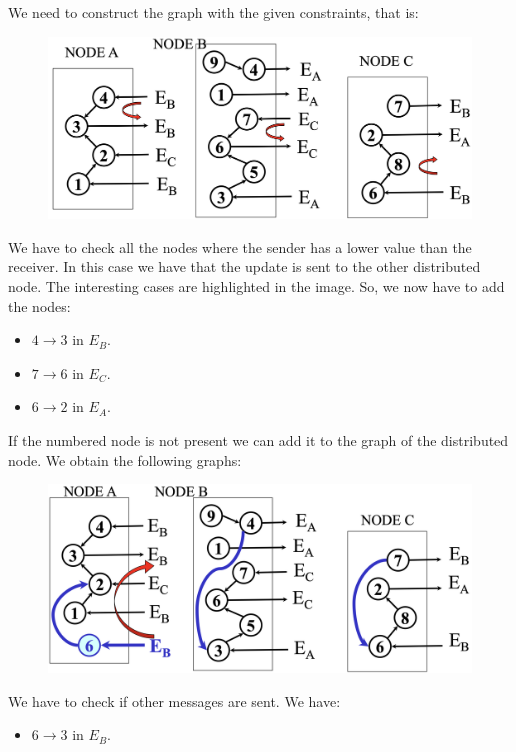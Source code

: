 \documentclass[12pt, a4paper]{report}
\newtheorem[style=M,bodystyle=\normalfont]{theorem}{Theorem}
\newtheorem[style=M,bodystyle=\normalfont]{corollary}{Corollary}
\newtheorem[style=M,bodystyle=\normalfont]{lemma}{Lemma}
\newtheorem[style=M,bodystyle=\normalfont]{definition}{Definition}
\begin{document}
\begin{Answer}[ref=13]
    We need to construct the graph with the given constraints, that is: 
    \begin{figure}[H]
        \centering
        \includegraphics[width=1\linewidth]{images/Ob1.png}
    \end{figure}
    We have to check all the nodes where the sender has a lower value than the receiver. In this case we have that the update is sent to the 
    other distributed node. The interesting cases are highlighted in the image. So, we now have to add the nodes: 
    \begin{itemize}
        \item $4 \rightarrow 3$ in $E_B$. 
        \item $7 \rightarrow 6$ in $E_C$. 
        \item $6 \rightarrow 2$ in $E_A$. 
    \end{itemize}
    If the numbered node is not present we can add it to the graph of the distributed node. We obtain the following graphs: 
    \begin{figure}[H]
        \centering
        \includegraphics[width=1\linewidth]{images/Ob2.png}
    \end{figure}
    We have to check if other messages are sent. We have:
    \begin{itemize}
        \item $6 \rightarrow 3$ in $E_B$. 

\end{itemize}
\end{Answer}
\end{document}

